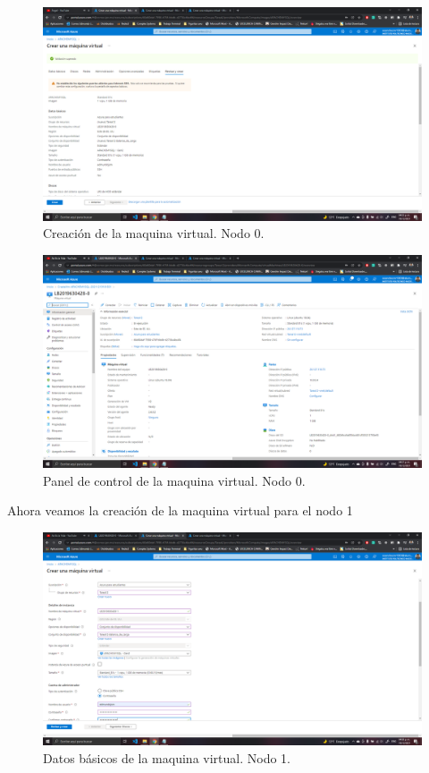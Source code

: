 \documentclass[11pt]{article}
\begin{document}
		\begin{figure}[H]
			\centering
			\includegraphics[scale=0.34]{resources/revisarycrear0.png}
			\caption{Creación de la maquina virtual. Nodo 0.}\label{fig:picture}
		\end{figure}
		\begin{figure}[H]
			\centering
			\includegraphics[scale=0.34]{resources/Panelcontrol0.png}
			\caption{Panel de control de la maquina virtual. Nodo 0.}\label{fig:picture}
		\end{figure}
		Ahora veamos la creación de la maquina virtual para el nodo 1
		\begin{figure}[H]
			\centering
			\includegraphics[scale=0.34]{resources/datosbasicos1.png}
			\caption{Datos básicos de la maquina virtual. Nodo 1.}\label{fig:picture}
		\end{figure}
\end{document}
